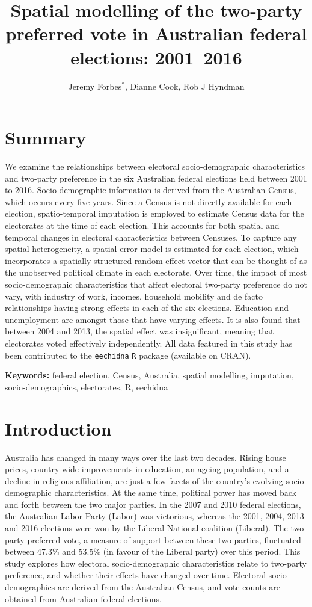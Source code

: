 \documentclass[times, doublespace]{anzsauth}
\title{Spatial modelling of the two-party preferred vote in Australian federal elections: 2001--2016}
\author{Jeremy Forbes\(^*\), Dianne Cook, Rob J Hyndman}
\date{}
\let\oldmaketitle\maketitle
\def\maketitle{\cleanlookdateon\oldmaketitle}
\begin{document}
\maketitle

\hypertarget{summary}{%
\section*{Summary}\label{summary}}

We examine the relationships between electoral socio-demographic characteristics and two-party preference in the six Australian federal elections held between 2001 to 2016. Socio-demographic information is derived from the Australian Census, which occurs every five years. Since a Census is not directly available for each election, spatio-temporal imputation is employed to estimate Census data for the electorates at the time of each election. This accounts for both spatial and temporal changes in electoral characteristics between Censuses. To capture any spatial heterogeneity, a spatial error model is estimated for each election, which incorporates a spatially structured random effect vector that can be thought of as the unobserved political climate in each electorate. Over time, the impact of most socio-demographic characteristics that affect electoral two-party preference do not vary, with industry of work, incomes, household mobility and de facto relationships having strong effects in each of the six elections. Education and unemployment are amongst those that have varying effects. It is also found that between 2004 and 2013, the spatial effect was insignificant, meaning that electorates voted effectively independently. All data featured in this study has been contributed to the \texttt{eechidna} \texttt{R} package (available on CRAN).

\textbf{Keywords:} federal election, Census, Australia, spatial modelling, imputation, socio-demographics, electorates, R, eechidna

\hypertarget{intro}{%
\section{Introduction}\label{intro}}

Australia has changed in many ways over the last two decades. Rising house prices, country-wide improvements in education, an ageing population, and a decline in religious affiliation, are just a few facets of the country's evolving socio-demographic characteristics. At the same time, political power has moved back and forth between the two major parties. In the 2007 and 2010 federal elections, the Australian Labor Party (Labor) was victorious, whereas the 2001, 2004, 2013 and 2016 elections were won by the Liberal National coalition (Liberal). The two-party preferred vote, a measure of support between these two parties, fluctuated between 47.3\% and 53.5\% (in favour of the Liberal party) over this period. This study explores how electoral socio-demographic characteristics relate to two-party preference, and whether their effects have changed over time. Electoral socio-demographics are derived from the Australian Census, and vote counts are obtained from Australian federal elections.
\end{document}
